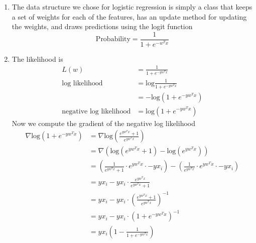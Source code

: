 \documentclass{article}
\begin{document}
\begin{enumerate}
\begin{enumerate}
            \item %
                The data structure we chose for logistic regression is
                simply a class that keeps a set of weights for each of the
                features, has an update method for updating the weights,
                and draws predictions using the logit function
                \begin{equation*}
                    \text{Probability} = \frac{1}{1 + e^{-w^Tx}}
                \end{equation*}
            \item %
                The likelihood is
                \begin{align*}
                    L(w) 
                        &= \frac{1}{1 + e^{-yw^Tx}} \\
                    \text{log likelihood} 
                        &= \text{log}\frac{1}{1 + e^{-yw^Tx}} \\
                        &= -\text{log} (1 + e^{-yw^Tx}) \\
                    \text{negative log likelihood}
                        &= \text{log} (1 + e^{-yw^Tx})
                \end{align*}
                Now we compute the gradient of the negative log likelihood
                \begin{align*}
                    \nabla \text{log} (1 + e^{-yw^Tx})
                        &= \nabla \text{log} \left( \frac{e^{yw^Tx} + 1}
                            {e^{yw^Tx}} \right) \\
                        &= \nabla \left( \text{log}(e^{yw^Tx} + 1) -
                            \text{log}(e^{yw^Tx}) \right) \\
                        &= \left( \frac{1}{e^{yw^Tx} + 1} \cdot e^{yw^Tx}
                            \cdot -yx_i \right) - \left( 
                            \frac{1}{e^{yw^Tx}} \cdot e^{yw^Tx} \cdot 
                            -yx_i \right) \\
                        &= yx_i - yx_i \cdot \frac{e^{yw^Tx}}
                            {e^{yw^Tx}+1} \\
                        &= yx_i - yx_i \cdot \left( \frac{e^{yw^Tx}+1}
                            {e^{yw^Tx}} \right)^{-1} \\
                        &= yx_i - yx_i \cdot (1 + e^{-yw^Tx})^{-1} \\
                        &= yx_i \left( 1 - \frac{1}{1 + e^{-yw^Tx}} \right)
                \end{align*}

\end{enumerate}
\end{enumerate}
\end{document}
